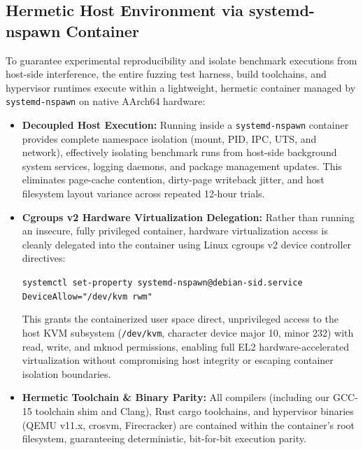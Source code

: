 \documentclass{article}
\begin{document}
\subsection{Hermetic Host Environment via systemd-nspawn Container}\label{sec:nspawn_env}
To guarantee experimental reproducibility and isolate benchmark executions from host-side interference, the entire fuzzing test harness, build toolchains, and hypervisor runtimes execute within a lightweight, hermetic container managed by \texttt{systemd-nspawn} on native AArch64 hardware:
\begin{itemize}[leftmargin=*]
    \item \textbf{Decoupled Host Execution:} Running inside a \texttt{systemd-nspawn} container provides complete namespace isolation (mount, PID, IPC, UTS, and network), effectively isolating benchmark runs from host-side background system services, logging daemons, and package management updates. This eliminates page-cache contention, dirty-page writeback jitter, and host filesystem layout variance across repeated 12-hour trials.
    \item \textbf{Cgroups v2 Hardware Virtualization Delegation:} Rather than running an insecure, fully privileged container, hardware virtualization access is cleanly delegated into the container using Linux cgroups v2 device controller directives:
    \begin{center}
    \texttt{systemctl set-property systemd-nspawn@debian-sid.service DeviceAllow="/dev/kvm rwm"}
    \end{center}
    This grants the containerized user space direct, unprivileged access to the host KVM subsystem (\texttt{/dev/kvm}, character device major 10, minor 232) with read, write, and mknod permissions, enabling full EL2 hardware-accelerated virtualization without compromising host integrity or escaping container isolation boundaries.
    \item \textbf{Hermetic Toolchain \& Binary Parity:} All compilers (including our GCC-15 toolchain shim and Clang), Rust cargo toolchains, and hypervisor binaries (QEMU v11.x, crosvm, Firecracker) are contained within the container's root filesystem, guaranteeing deterministic, bit-for-bit execution parity.
\end{itemize}
\end{document}
